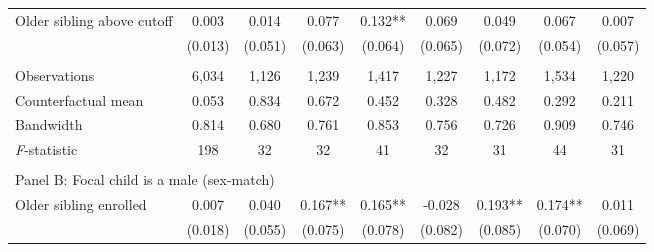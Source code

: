 \begin{table}[!htbp]
{{\begin{tabular}{lcccccccc}
Older sibling above cutoff&       0.003   &       0.014   &       0.077   &       0.132** &       0.069   &       0.049   &       0.067   &       0.007   \\
                    &     (0.013)   &     (0.051)   &     (0.063)   &     (0.064)   &     (0.065)   &     (0.072)   &     (0.054)   &     (0.057)   \\
                    &               &               &               &               &               &               &               &               \\
Observations        &       6,034   &       1,126   &       1,239   &       1,417   &       1,227   &       1,172   &       1,534   &       1,220   \\
Counterfactual mean &       0.053   &       0.834   &       0.672   &       0.452   &       0.328   &       0.482   &       0.292   &       0.211   \\
Bandwidth           &       0.814   &       0.680   &       0.761   &       0.853   &       0.756   &       0.726   &       0.909   &       0.746   \\
\textit{F}-statistic&         198   &          32   &          32   &          41   &          32   &          31   &          44   &          31   \\
 
&  &  &  &  \\
\multicolumn{10}{l}{Panel B: Focal child is a male (sex-match)} \\
Older sibling enrolled&       0.007   &       0.040   &       0.167** &       0.165** &      -0.028   &       0.193** &       0.174** &       0.011   \\
                    &     (0.018)   &     (0.055)   &     (0.075)   &     (0.078)   &     (0.082)   &     (0.085)   &     (0.070)   &     (0.069)   \\
 

\end{tabular}}}
\end{table}
